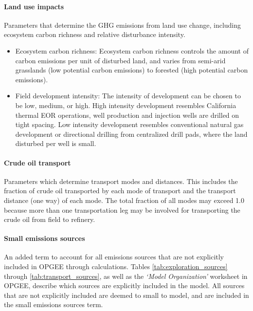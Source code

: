 \documentclass[11pt]{report}
\newcommand{\marg}[1]{{\footnotesize\textit{\textcolor{stanford}{'#1'}}}}
\newcommand{\marginnote}[1]{\marginpar{\marg{#1}}}
\newcommand{\sheet}[1]{\textit{`{#1}'}}
\begin{document}
\paragraph{Land use impacts} Parameters that determine the \marginnote{Inputs 1.6} GHG emissions from land use change, including ecosystem carbon richness and relative disturbance intensity. 
\begin{itemize}
\item Ecosystem carbon richness: Ecosystem carbon richness controls the amount of carbon emissions per unit of disturbed land, and varies from semi-arid grasslands (low potential carbon emissions) to forested (high potential carbon emissions). 
\item Field development intensity: The intensity of development can be chosen to be low, medium, or high. High intensity development resembles California thermal EOR operations, well production and injection wells are drilled on tight spacing. Low intensity development resembles conventional natural gas development or directional drilling from centralized drill pads, where the land disturbed per well is small.
\end{itemize}

\paragraph{Crude oil transport} Parameters which determine transport \marginnote{Inputs 1.7} modes and distances. This includes the fraction of crude oil transported by each mode of transport and the transport distance (one way) of each mode. The total fraction of all modes may exceed 1.0 because more than one transportation leg may be involved for transporting the crude oil from field to refinery.


\paragraph{Small emissions sources} An added term to account for all \marginnote{Inputs 1.8} emissions sources that are not explicitly included in OPGEE through calculations. Tables \ref{tab:exploration_sources} through \ref{tab:transport_sources}, as well as the \sheet{Model Organization} worksheet in OPGEE, describe which sources are explicitly included in the model. All sources that are not explicitly included are deemed to small to model, and are included in the small emissions sources term.
\vspace{0.1in}
\end{document}
